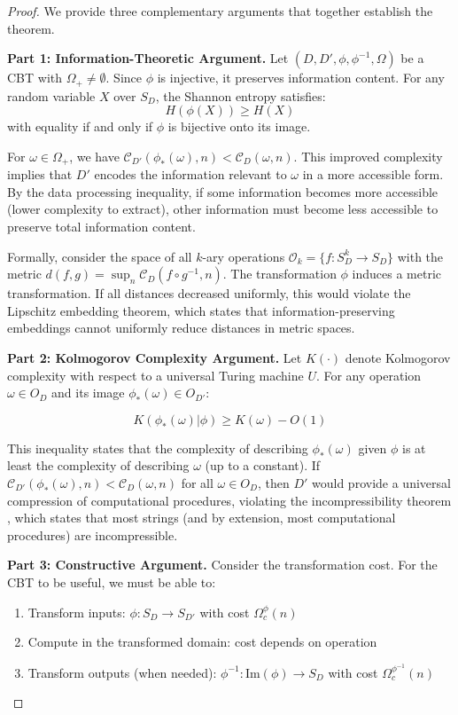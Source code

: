 \documentclass[11pt]{article}
\theoremstyle{definition}
\begin{document}
\begin{proof}
We provide three complementary arguments that together establish the theorem.

\textbf{Part 1: Information-Theoretic Argument.}
Let $(D, D', \phi, \phi^{-1}, \Omega)$ be a CBT with $\Omega_+ \neq \emptyset$. Since $\phi$ is injective, it preserves information content. For any random variable $X$ over $S_D$, the Shannon entropy satisfies:
$$H(\phi(X)) \geq H(X)$$
with equality if and only if $\phi$ is bijective onto its image.

For $\omega \in \Omega_+$, we have $\mathcal{C}_{D'}(\phi_*(\omega), n) < \mathcal{C}_D(\omega, n)$. This improved complexity implies that $D'$ encodes the information relevant to $\omega$ in a more accessible form. By the data processing inequality, if some information becomes more accessible (lower complexity to extract), other information must become less accessible to preserve total information content.

Formally, consider the space of all $k$-ary operations $\mathcal{O}_k = \{f: S_D^k \to S_D\}$ with the metric $d(f, g) = \sup_n \mathcal{C}_D(f \circ g^{-1}, n)$. The transformation $\phi$ induces a metric transformation. If all distances decreased uniformly, this would violate the Lipschitz embedding theorem, which states that information-preserving embeddings cannot uniformly reduce distances in metric spaces.

\textbf{Part 2: Kolmogorov Complexity Argument.}
Let $K(\cdot)$ denote Kolmogorov complexity with respect to a universal Turing machine $U$. For any operation $\omega \in O_D$ and its image $\phi_*(\omega) \in O_{D'}$:

\begin{equation}
K(\phi_*(\omega) | \phi) \geq K(\omega) - O(1)
\end{equation}

This inequality states that the complexity of describing $\phi_*(\omega)$ given $\phi$ is at least the complexity of describing $\omega$ (up to a constant). If $\mathcal{C}_{D'}(\phi_*(\omega), n) < \mathcal{C}_D(\omega, n)$ for all $\omega \in O_D$, then $D'$ would provide a universal compression of computational procedures, violating the incompressibility theorem \cite{li2008introduction}, which states that most strings (and by extension, most computational procedures) are incompressible.

\textbf{Part 3: Constructive Argument.}
Consider the transformation cost. For the CBT to be useful, we must be able to:
\begin{enumerate}
\item Transform inputs: $\phi: S_D \to S_{D'}$ with cost $\Omega_c^{\phi}(n)$
\item Compute in the transformed domain: cost depends on operation
\item Transform outputs (when needed): $\phi^{-1}: \mathrm{Im}(\phi) \to S_D$ with cost $\Omega_c^{\phi^{-1}}(n)$
\end{enumerate}


\end{proof}
\end{document}
